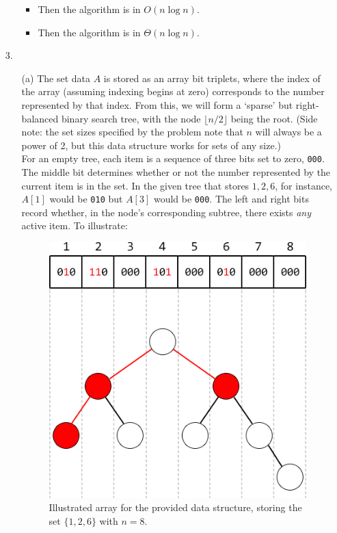 \documentclass{article}
\begin{document}
\begin{enumerate}
\begin{enumerate}
\begin{itemize}
        \item Then the algorithm is in $O(n \log n)$.
        \item Then the algorithm is in $\Theta(n \log n)$.
        \end{itemize}
    \end{enumerate}
\item [3.]
    \begin{enumerate}
        \item [(a)] The set data $A$ is stored as an array bit triplets, where the index of the array (assuming indexing begins at zero) corresponds to the number represented by that index. From this, we will form a `sparse' but right-balanced binary search tree, with the node $\lfloor n / 2 \rfloor$ being the root. (Side note: the set sizes specified by the problem note that $n$ will always be a power of 2, but this data structure works for sets of any size.) \\

        For an empty tree, each item is a sequence of three bits set to zero, \texttt{000}. The middle bit determines whether or not the number represented by the current item is in the set. In the given tree that stores ${1, 2, 6}$, for instance, $A[1]$ would be \texttt{010} but $A[3]$ would be \texttt{000}. The left and right bits record whether, in the node's corresponding subtree, there exists \textit{any} active item. To illustrate:

            \begin{figure}[h]
                \begin{center}
                \includegraphics[scale=0.5]{csc263-a1-q3-illustration}
                \caption{Illustrated array for the provided data structure, storing the set $\{1, 2, 6\}$ with $n = 8$.}
                \end{center}
            \end{figure}


\end{enumerate}
\end{enumerate}
\end{document}
